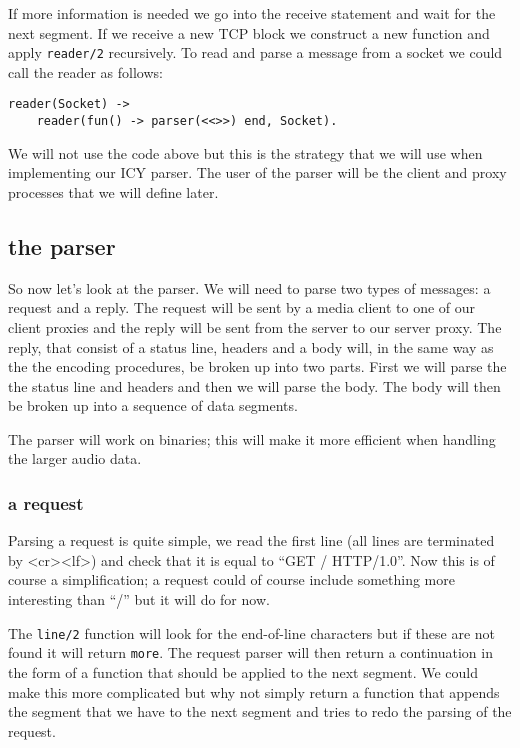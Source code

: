 \documentclass[a4paper,11pt]{article}
\begin{document}
If more information is needed we go into the receive statement and
wait for the next segment. If we receive a new TCP block we construct
a new function and apply {\tt reader/2} recursively. To read and parse
a message from a socket we could call the reader as follows:

\begin{verbatim}
reader(Socket) ->
    reader(fun() -> parser(<<>>) end, Socket).
\end{verbatim}


We will not use the code above but this is the strategy that we will
use when implementing our ICY parser. The user of the parser will be
the client and proxy processes that we will define later.


\subsection{the parser}

So now let's look at the parser. We will need to parse two types of
messages: a request and a reply. The request will be sent by a media
client to one of our client proxies and the reply will be sent from
the server to our server proxy.  The reply, that consist of a status
line, headers and a body will, in the same way as the the encoding
procedures, be broken up into two parts. First we will parse the the
status line and headers and then we will parse the body. The body will
then be broken up into a sequence of data segments.

The parser will work on binaries; this will make it more efficient
when handling the larger audio data. 

\subsubsection{a request}

Parsing a request is quite simple, we read the first line (all lines
are terminated by \textless cr\textgreater \textless lf\textgreater)
and check that it is equal to ``GET / HTTP/1.0''. Now this is of
course a simplification; a request could of course include something
more interesting than ``/'' but it will do for now.

The {\tt line/2} function will look for the end-of-line characters but
if these are not found it will return {\tt more}. The request parser
will then return a continuation in the form of a function that should
be applied to the next segment. We could make this more complicated
but why not simply return a function that appends the segment that we
have to the next segment and tries to redo the parsing of the request.
\end{document}
